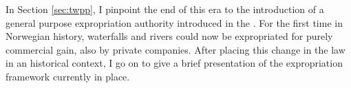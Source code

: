 %
%

In Section \ref{sec:twpp}, I pinpoint the end of this era to the introduction of a general purpose expropriation authority introduced in the \cite{wra00}. For the first time in Norwegian history, waterfalls and rivers could now be expropriated for purely commercial gain, also by private companies. After placing this change in the law in an historical context, I go on to give a brief presentation of the expropriation framework currently in place. %

